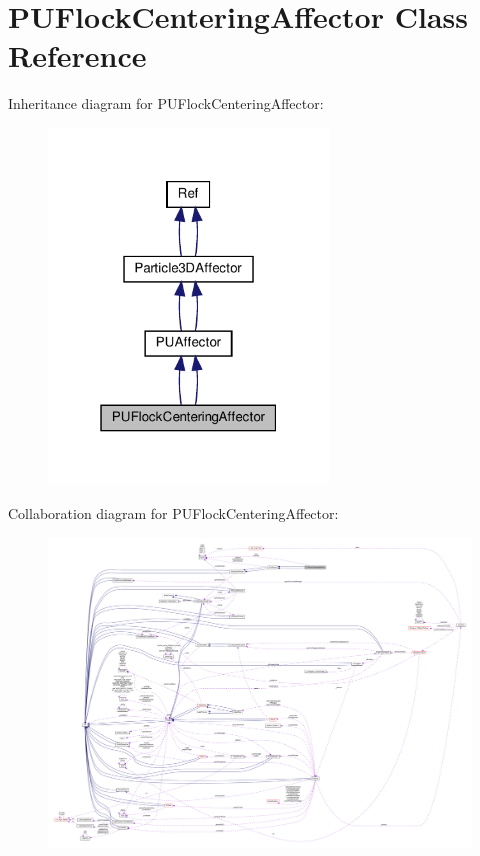 \hypertarget{classPUFlockCenteringAffector}{}\section{P\+U\+Flock\+Centering\+Affector Class Reference}
\label{classPUFlockCenteringAffector}


Inheritance diagram for P\+U\+Flock\+Centering\+Affector\+:
\nopagebreak
\begin{figure}[H]
\begin{center}
\leavevmode
\includegraphics[width=211pt]{classPUFlockCenteringAffector__inherit__graph}
\end{center}
\end{figure}


Collaboration diagram for P\+U\+Flock\+Centering\+Affector\+:
\nopagebreak
\begin{figure}[H]
\begin{center}
\leavevmode
\includegraphics[width=350pt]{classPUFlockCenteringAffector__coll__graph}
\end{center}
\end{figure}
